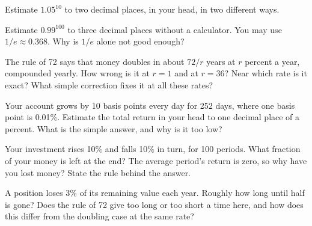 \begin{question}\label{iq:iv1:mental-technique:26}
Estimate $1.05^{10}$ to two decimal places, in your head, in two different ways.
\end{question}

\begin{question}\label{iq:iv1:mental-technique:27}
Estimate $0.99^{100}$ to three decimal places without a calculator. You may use $1/e \approx 0.368$. Why is $1/e$ alone not good enough?
\end{question}

\begin{question}\label{iq:iv1:mental-technique:28}
The rule of 72 says that money doubles in about $72/r$ years at $r$ percent a year, compounded yearly. How wrong is it at $r = 1$ and at $r = 36$? Near which rate is it exact? What simple correction fixes it at all these rates?
\end{question}

\begin{question}\label{iq:iv1:mental-technique:29}
Your account grows by 10 basis points every day for 252 days, where one basis point is 0.01\%. Estimate the total return in your head to one decimal place of a percent. What is the simple answer, and why is it too low?
\end{question}

\begin{question}\label{iq:iv1:mental-technique:30}
Your investment rises 10\% and falls 10\% in turn, for 100 periods. What fraction of your money is left at the end? The average period's return is zero, so why have you lost money? State the rule behind the answer.
\end{question}

\begin{question}\label{iq:iv1:mental-technique:31}
A position loses 3\% of its remaining value each year. Roughly how long until half is gone? Does the rule of 72 give too long or too short a time here, and how does this differ from the doubling case at the same rate?
\end{question}

